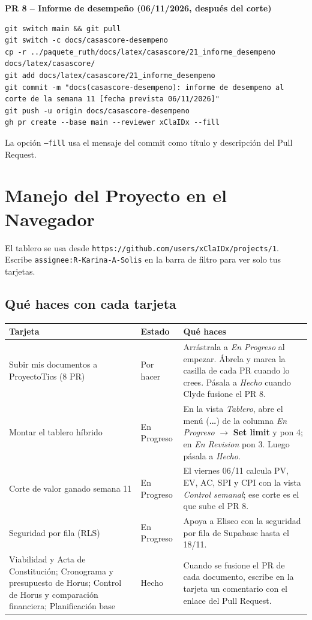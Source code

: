 \documentclass[11pt,a4paper]{article}
\begin{document}
\noindent\textbf{PR 8 -- Informe de desempeño (06/11/2026, después del corte)}
\begin{lstlisting}
git switch main && git pull
git switch -c docs/casascore-desempeno
cp -r ../paquete_ruth/docs/latex/casascore/21_informe_desempeno docs/latex/casascore/
git add docs/latex/casascore/21_informe_desempeno
git commit -m "docs(casascore-desempeno): informe de desempeno al corte de la semana 11 [fecha prevista 06/11/2026]"
git push -u origin docs/casascore-desempeno
gh pr create --base main --reviewer xClaIDx --fill
\end{lstlisting}

\noindent La opción \texttt{--fill} usa el mensaje del commit como título y descripción del Pull Request.

\section{Manejo del Proyecto en el Navegador}
El tablero se usa desde \nolinkurl{https://github.com/users/xClaIDx/projects/1}. Escribe \nolinkurl{assignee:R-Karina-A-Solis} en la barra de filtro para ver solo tus tarjetas.

\subsection{Qué haces con cada tarjeta}
{\small
{}
\noindent\begin{tabularx}{\textwidth}{@{}P{4.4cm} C{1.9cm} L@{}}
\toprule
{}
\textbf{Tarjeta} & \textbf{Estado} & \textbf{Qué haces} \\
\midrule
Subir mis documentos a ProyectoTics (8 PR) & Por hacer & Arrástrala a \textit{En Progreso} al empezar. Ábrela y marca la casilla de cada PR cuando lo crees. Pásala a \textit{Hecho} cuando Clyde fusione el PR 8. \\
Montar el tablero híbrido & En Progreso & En la vista \textit{Tablero}, abre el menú (\textbf{\ldots}) de la columna \textit{En Progreso} $\rightarrow$ \textbf{Set limit} y pon 4; en \textit{En Revision} pon 3. Luego pásala a \textit{Hecho}. \\
Corte de valor ganado semana 11 & En Progreso & El viernes 06/11 calcula PV, EV, AC, SPI y CPI con la vista \textit{Control semanal}; ese corte es el que sube el PR 8. \\
Seguridad por fila (RLS) & En Progreso & Apoya a Eliseo con la seguridad por fila de Supabase hasta el 18/11. \\
Viabilidad y Acta de Constitución; Cronograma y presupuesto de Horus; Control de Horus y comparación financiera; Planificación base & Hecho & Cuando se fusione el PR de cada documento, escribe en la tarjeta un comentario con el enlace del Pull Request. \\
\bottomrule
\end{tabularx}
}
\end{document}
